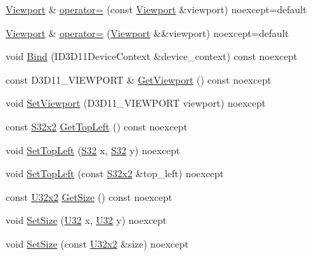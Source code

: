 \begin{DoxyCompactItemize}
\item 
\hyperlink{classmage_1_1rendering_1_1_viewport}{Viewport} \& \hyperlink{classmage_1_1rendering_1_1_viewport_afc42613270537b92aa837455b4c154f0}{operator=} (const \hyperlink{classmage_1_1rendering_1_1_viewport}{Viewport} \&viewport) noexcept=default
\item 
\hyperlink{classmage_1_1rendering_1_1_viewport}{Viewport} \& \hyperlink{classmage_1_1rendering_1_1_viewport_a62b0439861e78c3718f2b29339ec7226}{operator=} (\hyperlink{classmage_1_1rendering_1_1_viewport}{Viewport} \&\&viewport) noexcept=default
\item 
void \hyperlink{classmage_1_1rendering_1_1_viewport_a8aeb392ce46ab413d607cdea36033e21}{Bind} (I\+D3\+D11\+Device\+Context \&device\+\_\+context) const noexcept
\item 
const D3\+D11\+\_\+\+V\+I\+E\+W\+P\+O\+RT \& \hyperlink{classmage_1_1rendering_1_1_viewport_a9b931e5491d44459f598868eee59f1cc}{Get\+Viewport} () const noexcept
\item 
void \hyperlink{classmage_1_1rendering_1_1_viewport_a641dc22ff2ea12c7f3164b704e9ea479}{Set\+Viewport} (D3\+D11\+\_\+\+V\+I\+E\+W\+P\+O\+RT viewport) noexcept
\item 
const \hyperlink{namespacemage_a02de5a44f35ee9917e5788d63795fece}{S32x2} \hyperlink{classmage_1_1rendering_1_1_viewport_aa8155bd669f8ad083c4c20f8189cb293}{Get\+Top\+Left} () const noexcept
\item 
void \hyperlink{classmage_1_1rendering_1_1_viewport_a868977ddb855a6ad4c9ccf7e17a870a3}{Set\+Top\+Left} (\hyperlink{namespacemage_a642e05c5c83642b6946703615cdbf2da}{S32} x, \hyperlink{namespacemage_a642e05c5c83642b6946703615cdbf2da}{S32} y) noexcept
\item 
void \hyperlink{classmage_1_1rendering_1_1_viewport_ae29732ff3e897167c3c319224c7f8e0d}{Set\+Top\+Left} (const \hyperlink{namespacemage_a02de5a44f35ee9917e5788d63795fece}{S32x2} \&top\+\_\+left) noexcept
\item 
const \hyperlink{namespacemage_a88e05bff0300120c013285d3dcad95c5}{U32x2} \hyperlink{classmage_1_1rendering_1_1_viewport_a6e7381d208af8d079e93d8e04739eb36}{Get\+Size} () const noexcept
\item 
void \hyperlink{classmage_1_1rendering_1_1_viewport_af0db77599e1f1ec246ca3f1440ebb0ac}{Set\+Size} (\hyperlink{namespacemage_a41c104c036fba3756a74e19f793eeaa1}{U32} x, \hyperlink{namespacemage_a41c104c036fba3756a74e19f793eeaa1}{U32} y) noexcept
\item 
void \hyperlink{classmage_1_1rendering_1_1_viewport_a8b5578069d4e4afa99ca4a0b89541025}{Set\+Size} (const \hyperlink{namespacemage_a88e05bff0300120c013285d3dcad95c5}{U32x2} \&size) noexcept

\end{DoxyCompactItemize}
